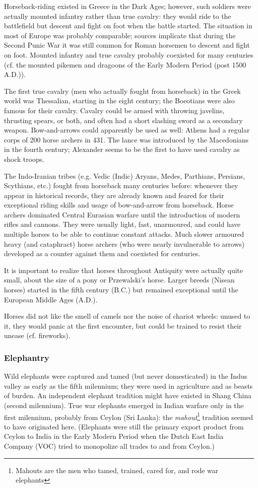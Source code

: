 \documentclass{article}
\begin{document}
Horseback-riding existed in Greece in the Dark Ages; however, such soldiers were actually mounted infantry rather than true cavalry: they would ride to the battlefield but descent and fight on foot when the battle started. The situation in most of Europe was probably comparable; sources implicate that during the Second Punic War it was still common for Roman horsemen to descent and fight on foot. Mounted infantry and true cavalry probably coexisted for many centuries (cf. the mounted pikemen and dragoons of the Early Modern Period (post 1500 A.D.)).

The first true cavalry (men who actually fought from horseback) in the Greek world was Thessalian, starting in the eight century; the Boeotians were also famous for their cavalry. Cavalry could be armed with throwing javelins, thrusting spears, or both, and often had a short slashing sword as a secondary weapon. Bow-and-arrows could apparently be used as well: Athens had a regular corps of 200 horse archers in 431. The lance was introduced by the Macedonians in the fourth century; Alexander seems to be the first to have used cavalry as shock troops.

The Indo-Iranian tribes (e.g. Vedic (Indic) Aryans, Medes, Parthians, Persians, Scythians, etc.) fought from horseback many centuries before: whenever they appear in historical records, they are already known and feared for their exceptional riding skills and usage of bow-and-arrow from horseback. Horse archers dominated Central Eurasian warfare until the introduction of modern rifles and cannons. They were usually light, fast, unarmoured, and could have multiple horses to be able to continue constant attacks. Much slower armoured heavy (and cataphract) horse archers (who were nearly invulnerable to arrows) developed as a counter against them and coexisted for centuries.

It is important to realize that horses throughout Antiquity were actually quite small, about the size of a pony or Przewalski's horse. Larger breeds (Nisean horses) started in the fifth century (B.C.) but remained exceptional until the European Middle Ages (A.D.).

Horses did not like the smell of camels nor the noise of chariot wheels: unused to it, they would panic at the first encounter, but could be trained to resist their unease (cf. fireworks).

\subsubsection{Elephantry}
Wild elephants were captured and tamed (but never domesticated) in the Indus valley as early as the fifth milennium; they were used in agriculture and as beasts of burden. An independent elephant tradition might have existed in Shang China (second milennium). True war elephants emerged in Indian warfare only in the first milennium, probably from Ceylon (Sri Lanka): the \textit{mahout}\footnote{Mahouts are the men who tamed, trained, cared for, and rode war elephants} tradition seemed to have originated here. 
(Elephants were still the primary export product from Ceylon to India in the Early Modern Period when the Dutch East India Company (VOC) tried to monopolize all trades to and from Ceylon.)
\end{document}
